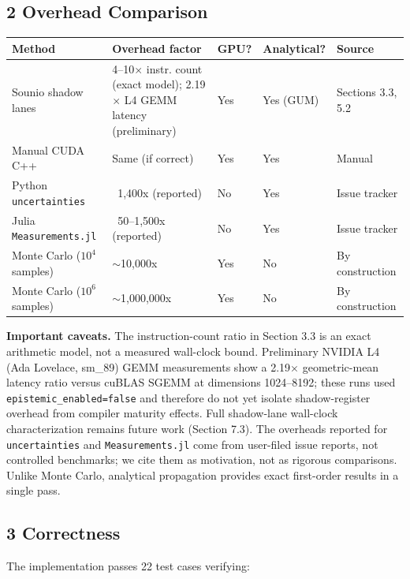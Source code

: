 \documentclass[11pt]{article}
\begin{document}
{{\subsection{2 Overhead Comparison}

\begin{table}[t]\centering
\begin{tabular}{lllll}
\toprule
Method & Overhead factor & GPU? & Analytical? & Source \\
\midrule
Sounio shadow lanes & 4–10$\times$ instr. count (exact model); 2.19$\times$ L4 GEMM latency (preliminary) & Yes & Yes (GUM) & Sections 3.3, 5.2 \\
Manual CUDA C++ & Same (if correct) & Yes & Yes & Manual \\
Python \texttt{uncertainties} \cite{uncertainties} & ~1,400x (reported) & No & Yes & Issue tracker \cite{uncertainties_issue57} \\
Julia \texttt{Measurements.jl} \cite{measurementsjl} & ~50–1,500x (reported) & No & Yes & Issue tracker \cite{measurements_issue25} \\
Monte Carlo ($10^4$ samples) & $\sim$10,000x & Yes & No & By construction \\
Monte Carlo ($10^6$ samples) & $\sim$1,000,000x & Yes & No & By construction \\
\bottomrule
\end{tabular}
\end{table}

\textbf{Important caveats.} The instruction-count ratio in Section 3.3 is an exact arithmetic model, not a measured wall-clock bound. Preliminary NVIDIA L4 (Ada Lovelace, sm\_89) GEMM measurements show a 2.19$\times$ geometric-mean latency ratio versus cuBLAS SGEMM at dimensions 1024–8192; these runs used \texttt{epistemic_enabled=false} and therefore do not yet isolate shadow-register overhead from compiler maturity effects. Full shadow-lane wall-clock characterization remains future work (Section 7.3). The overheads reported for \texttt{uncertainties} and \texttt{Measurements.jl} come from user-filed issue reports, not controlled benchmarks; we cite them as motivation, not as rigorous comparisons. Unlike Monte Carlo, analytical propagation provides exact first-order results in a single pass.

\subsection{3 Correctness}

The implementation passes 22 test cases verifying:

}}
\end{document}
